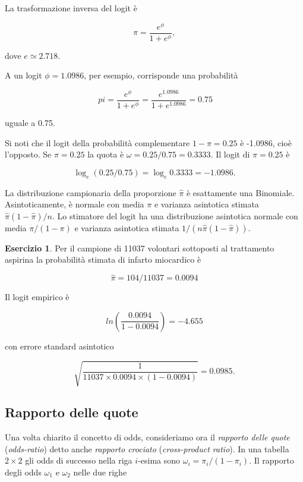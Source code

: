 \documentclass[
  11pt,
]{krantz}
\theoremstyle{definition}
\theoremstyle{definition}
\theoremstyle{definition}
\newtheorem{exercise}{Esercizio}[chapter]
\theoremstyle{definition}
\theoremstyle{remark}
\begin{document}
La trasformazione inversa del logit è

\[
\pi = \frac{e^{\phi}}{1+e^{\phi}},
\]

dove \(e \simeq 2.718\).

A un logit \(\phi = 1.0986\), per esempio, corrisponde una probabilità

\[\
pi = \frac{e^{\phi}}{1+e^{\phi}}=\frac{e^{1.0986}}{1+e^{1.0986}}=0.75
\]

uguale a 0.75.

Si noti che il logit della probabilità complementare \(1 -\pi = 0.25\) è -1.0986, cioè l'opposto. Se \(\pi = 0.25\) la quota è \(\omega = 0.25/0.75 = 0.3333\). Il logit di \(\pi = 0.25\) è

\[
\log_e (0.25/0.75) = \log_e 0.3333 = -1.0986.
\]

La distribuzione campionaria della proporzione \(\hat{\pi}\) è esattamente una Binomiale. Asintoticamente, è normale con media \(\pi\) e varianza asintotica stimata \(\hat{\pi}(1 - \hat{\pi})/n\). Lo stimatore del logit ha una distribuzione asintotica normale con media \(\pi/(1 -\pi)\) e varianza asintotica stimata \(1/(n \hat{\pi}(1 - \hat{\pi}))\).

\begin{exercise}
Per il campione di 11037 volontari sottoposti al trattamento aspirina la probabilità stimata di infarto miocardico è

\[
\hat{\pi} = 104/11037 = 0.0094
\]

Il logit empirico è

\[
ln \left( \frac{0.0094}{1- 0.0094} \right) =-4.655
\]

con errore standard asintotico

\[
\sqrt{\frac{1}{11037 \times 0.0094 \times (1-0.0094)}}= 0.0985.
\]
\end{exercise}

\hypertarget{rapporto-delle-quote}{%
\subsection{Rapporto delle quote}\label{rapporto-delle-quote}}

Una volta chiarito il concetto di odds, consideriamo ora il \emph{rapporto delle quote} (\emph{odds-ratio}) detto anche \emph{rapporto crociato} (\emph{cross-product ratio}). In una tabella \(2 \times 2\) gli odds di successo nella riga \(i\)-esima sono \(\omega_i = \pi_i / (1-\pi_i)\). Il rapporto degli odds \(\omega_1\) e \(\omega_2\) nelle due righe
\end{document}
